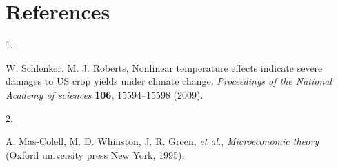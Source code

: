 \documentclass[
  12pt,
]{article}
\newlength{\cslhangindent}
\newlength{\csllabelwidth}
\newlength{\cslentryspacingunit} %
\newenvironment{CSLReferences}[2] %
 {%
  \setlength{\parindent}{0pt}
  \ifodd #1
  \let\oldpar\par
  \def\par{\hangindent=\cslhangindent\oldpar}
  \fi
  \setlength{\parskip}{#2\cslentryspacingunit}
 }%
 {}
\newcommand{\CSLLeftMargin}[1]{\parbox[t]{\csllabelwidth}{#1}}
\newcommand{\CSLRightInline}[1]{\parbox[t]{\linewidth - \csllabelwidth}{#1}\break}
\begin{document}
\hypertarget{references}{%
\section*{References}\label{references}}

\hypertarget{refs}{}
\begin{CSLReferences}{0}{0}
\leavevmode{}%
\CSLLeftMargin{1. }%
\CSLRightInline{W. Schlenker, M. J. Roberts, Nonlinear temperature effects indicate severe damages to US crop yields under climate change. \emph{Proceedings of the National Academy of sciences} \textbf{106}, 15594--15598 (2009).}

\leavevmode{}%
\CSLLeftMargin{2. }%
\CSLRightInline{A. Mas-Colell, M. D. Whinston, J. R. Green, \emph{et al.}, \emph{Microeconomic theory} (Oxford university press New York, 1995).}

\end{CSLReferences}
\end{document}
